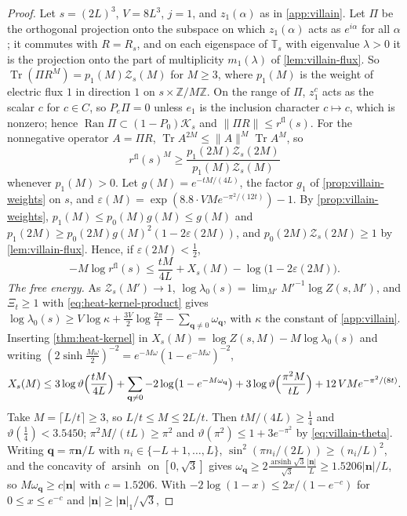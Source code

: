 \documentclass[11pt,a4paper]{amsart}
\theoremstyle{definition}
\theoremstyle{remark}
\numberwithin{equation}{section}
\DeclareMathOperator{\Tr}{Tr}        %
\newcommand{\Z}{\mathbb{Z}}          %
\newcommand{\Kspace}{\mathcal{K}}    %
\newcommand{\norm}[1]{\lVert #1\rVert}     %
\newcommand{\abs}[1]{\lvert #1\rvert}      %
\newcommand{\TT}{\mathbb{T}}               %
\newcommand{\Zpart}[2]{Z(#1,#2)}           %
\newcommand{\Zc}{\mathcal{Z}}              %
\newcommand{\Zs}[2]{\Zc_{#1}(#2)}          %
\newcommand{\XT}[2]{X_{#1}(#2)}            %
\newcommand{\cube}[1]{(2#1)^3}             %
\newcommand{\lzero}{\lambda_0}             %
\begin{document}
\begin{proof}
Let $s=\cube L$, $V=8L^3$, $j=1$, and $z_1(\alpha)$ as in \cref{app:villain}. Let $\Pi$ be the orthogonal projection onto the subspace on which $z_1(\alpha)$ acts as $e^{i\alpha}$ for all $\alpha$; it commutes with $R=R_s$, and on each eigenspace of $\TT_s$ with eigenvalue $\lambda>0$ it is the projection onto the part of multiplicity $m_1(\lambda)$ of \cref{lem:villain-flux}. So $\Tr(\Pi R^M)=p_1(M)\Zs sM$ for $M\ge3$, where $p_1(M)$ is the weight of electric flux $1$ in direction $1$ on $s\times\Z/M\Z$. On the range of $\Pi$, $z_1^c$ acts as the scalar $c$ for $c\in C$, so $P_e\Pi=0$ unless $e_1$ is the inclusion character $c\mapsto c$, which is nonzero; hence $\operatorname{Ran}\Pi\subset(1-P_0)\Kspace_s$ and $\norm{\Pi R}\le r^{\mathrm{fl}}(s)$. For the nonnegative operator $A=\Pi R$, $\Tr A^{2M}\le\norm A^M\Tr A^M$, so
\[
r^{\mathrm{fl}}(s)^M\ge\frac{p_1(2M)\Zs s{2M}}{p_1(M)\Zs sM}
\]
whenever $p_1(M)>0$. Let $g(M)=e^{-tM/(4L)}$, the factor $g_1$ of \cref{prop:villain-weights} on $s$, and $\varepsilon(M)=\exp(8.8\cdot VMe^{-\pi^2/(12t)})-1$. By \cref{prop:villain-weights}, $p_1(M)\le p_0(M)g(M)\le g(M)$ and $p_1(2M)\ge p_0(2M)g(M)^2(1-2\varepsilon(2M))$, and $p_0(2M)\Zs s{2M}\ge1$ by \cref{lem:villain-flux}. Hence, if $\varepsilon(2M)<\frac12$,
\[
-M\log r^{\mathrm{fl}}(s)\le\frac{tM}{4L}+\XT sM-\log\bigl(1-2\varepsilon(2M)\bigr).
\]
\emph{The free energy.} As $\Zs s{M'}\to1$, $\log\lzero(s)=\lim_{M'}M'^{-1}\log\Zpart s{M'}$, and $\Xi_t\ge1$ with \eqref{eq:heat-kernel-product} gives $\log\lzero(s)\ge V\log\kappa+\frac{3V}2\log\frac{2\pi}t-\sum_{\mathbf q\ne0}\omega_{\mathbf q}$, with $\kappa$ the constant of \cref{app:villain}. Inserting \cref{thm:heat-kernel} in $\XT sM=\log\Zpart sM-M\log\lzero(s)$ and writing $(2\sinh\frac{M\omega}2)^{-2}=e^{-M\omega}(1-e^{-M\omega})^{-2}$,
\[
\XT sM\le3\log\vartheta\Bigl(\frac{tM}{4L}\Bigr)+\sum_{\mathbf q\ne0}-2\log\bigl(1-e^{-M\omega_{\mathbf q}}\bigr)+3\log\vartheta\Bigl(\frac{\pi^2M}{tL}\Bigr)+12\,VMe^{-\pi^2/(8t)} .
\]
Take $M=\lceil L/t\rceil\ge3$, so $L/t\le M\le2L/t$. Then $tM/(4L)\ge\frac14$ and $\vartheta(\frac14)<3.5450$; $\pi^2M/(tL)\ge\pi^2$ and $\vartheta(\pi^2)\le1+3e^{-\pi^2}$ by \eqref{eq:villain-theta}. Writing $\mathbf q=\pi\mathbf n/L$ with $n_i\in\{-L+1,\dots,L\}$, $\sin^2(\pi n_i/(2L))\ge(n_i/L)^2$, and the concavity of $\operatorname{arsinh}$ on $[0,\sqrt3]$ gives $\omega_{\mathbf q}\ge2\frac{\operatorname{arsinh}\sqrt3}{\sqrt3}\frac{\abs{\mathbf n}}L\ge1.5206\abs{\mathbf n}/L$, so $M\omega_{\mathbf q}\ge c\abs{\mathbf n}$ with $c=1.5206$. With $-2\log(1-x)\le2x/(1-e^{-c})$ for $0\le x\le e^{-c}$ and $\abs{\mathbf n}\ge\abs{\mathbf n}_1/\sqrt3$,

\end{proof}
\end{document}
